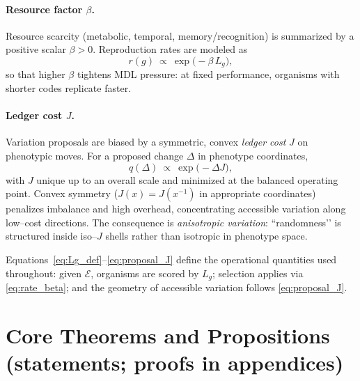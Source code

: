 \documentclass[11pt,a4paper]{article}
\begin{document}
\paragraph{Resource factor $\beta$.}
Resource scarcity (metabolic, temporal, memory/recognition) is summarized by a positive scalar $\beta>0$. Reproduction rates are modeled as
\begin{equation}\label{eq:rate_beta}
r(g)\ \propto\ \exp\!\big(-\beta\,L_g\big),
\end{equation}
so that higher $\beta$ tightens MDL pressure: at fixed performance, organisms with shorter codes replicate faster.

\paragraph{Ledger cost $J$.}
Variation proposals are biased by a symmetric, convex \emph{ledger cost} $J$ on phenotypic moves. For a proposed change $\Delta$ in phenotype coordinates,
\begin{equation}\label{eq:proposal_J}
q(\Delta)\ \propto\ \exp\!\big(-\Delta J\big),
\end{equation}
with $J$ unique up to an overall scale and minimized at the balanced operating point. Convex symmetry ($J(x)=J(x^{-1})$ in appropriate coordinates) penalizes imbalance and high overhead, concentrating accessible variation along low–cost directions. The consequence is \emph{anisotropic variation}: “randomness’’ is structured inside iso–$J$ shells rather than isotropic in phenotype space.

\medskip
\noindent
Equations~\eqref{eq:Lg_def}–\eqref{eq:proposal_J} define the operational quantities used throughout: given $\mathcal{E}$, organisms are scored by $L_g$; selection applies via \eqref{eq:rate_beta}; and the geometry of accessible variation follows \eqref{eq:proposal_J}.

\section{Core Theorems and Propositions (statements; proofs in appendices)}
\end{document}
